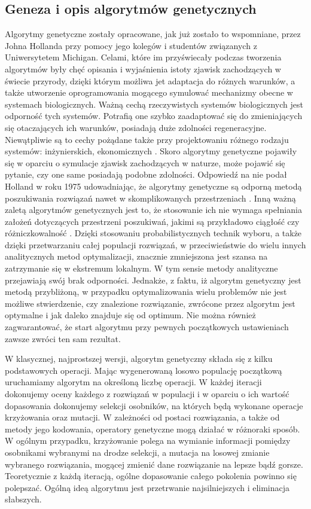 \subsection{Geneza i opis algorytmów genetycznych}
Algorytmy genetyczne zostały opracowane, jak już zostało to wspomniane, przez Johna Hollanda przy pomocy jego kolegów i studentów związanych z Uniwersytetem Michigan. Celami, które im przyświecały podczas tworzenia algorytmów były chęć opisania i wyjaśnienia istoty zjawisk zachodzących w świecie przyrody, dzięki którym możliwa jet adaptacja do różnych warunków, a także utworzenie oprogramowania mogącego symulować mechanizmy obecne w systemach biologicznych. Ważną cechą rzeczywistych systemów biologicznych jest odporność tych systemów. Potrafią one szybko zaadaptować się do zmieniających się otaczających ich warunków, posiadają duże zdolności regeneracyjne. Niewątpliwie są to cechy pożądane także przy projektowaniu różnego rodzaju systemów: inżynierskich, ekonomicznych \cite{GOLDBERG}. Skoro algorytmy genetyczne pojawiły się w oparciu o symulacje zjawisk zachodzących w naturze, może pojawić się pytanie, czy one same posiadają podobne zdolności. Odpowiedź na nie podał Holland w roku 1975 udowadniając, że algorytmy genetyczne są odporną metodą poszukiwania rozwiązań nawet w skomplikowanych przestrzeniach \cite{GOLDBERG}. Inną ważną zaletą algorytmów genetycznych jest to, że stosowanie ich nie wymaga spełniania założeń dotyczących przestrzeni poszukiwań, jakimi są przykładowo ciągłość czy różniczkowalność \cite{GOLDBERG}. Dzięki stosowaniu probabilistycznych technik wyboru, a także dzięki przetwarzaniu całej populacji rozwiązań, w przeciwieństwie do wielu innych analitycznych metod optymalizacji, znacznie zmniejszona jest szansa na zatrzymanie się w ekstremum lokalnym. W tym sensie metody analityczne przejawiają swój brak odporności.
Jednakże, z faktu, iż algorytm genetyczny jest metodą przybliżoną, w przypadku optymalizowania wielu problemów nie jest możliwe stwierdzenie, czy znalezione rozwiązanie, zwrócone przez algorytm jest optymalne i jak daleko znajduje się od optimum. Nie można również zagwarantować, że start algorytmu przy pewnych początkowych ustawieniach zawsze zwróci ten sam rezultat.

W klasycznej, najprostszej wersji, algorytm genetyczny składa się z kilku podstawowych operacji. Mając wygenerowaną losowo populację początkową uruchamiamy algorytm na określoną liczbę operacji. W każdej iteracji dokonujemy oceny każdego z rozwiązań w populacji i w oparciu o ich wartość dopasowania dokonujemy selekcji osobników, na których będą wykonane operacje krzyżowania oraz mutacji. W zależności od postaci rozwiązania, a także od metody jego kodowania, operatory genetyczne mogą działać w różnoraki sposób. W ogólnym przypadku, krzyżowanie polega na wymianie informacji pomiędzy osobnikami wybranymi na drodze selekcji, a mutacja na losowej zmianie wybranego rozwiązania, mogącej zmienić dane rozwiązanie na lepsze bądź gorsze. Teoretycznie z każdą iteracją, ogólne dopasowanie całego pokolenia powinno się polepszać. Ogólną ideą algorytmu jest przetrwanie najsilniejszych i eliminacja słabszych.

